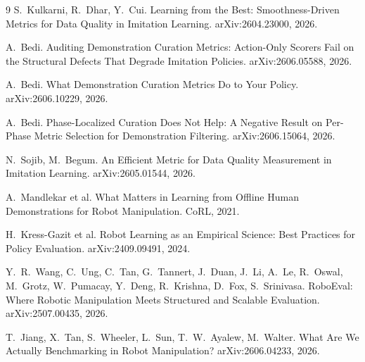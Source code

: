\documentclass[10pt]{article}
\begin{document}

\begin{thebibliography}{9}
S.~Kulkarni, R.~Dhar, Y.~Cui.
\newblock Learning from the Best: Smoothness-Driven Metrics for Data Quality
in Imitation Learning.
\newblock arXiv:2604.23000, 2026.

A.~Bedi.
\newblock Auditing Demonstration Curation Metrics: Action-Only Scorers Fail
on the Structural Defects That Degrade Imitation Policies.
\newblock arXiv:2606.05588, 2026.

A.~Bedi.
\newblock What Demonstration Curation Metrics Do to Your Policy.
\newblock arXiv:2606.10229, 2026.

A.~Bedi.
\newblock Phase-Localized Curation Does Not Help: A Negative Result on
Per-Phase Metric Selection for Demonstration Filtering.
\newblock arXiv:2606.15064, 2026.

N.~Sojib, M.~Begum.
\newblock An Efficient Metric for Data Quality Measurement in Imitation
Learning.
\newblock arXiv:2605.01544, 2026.

A.~Mandlekar et al.
\newblock What Matters in Learning from Offline Human Demonstrations for
Robot Manipulation.
\newblock CoRL, 2021.

H.~Kress-Gazit et al.
\newblock Robot Learning as an Empirical Science: Best Practices for Policy
Evaluation.
\newblock arXiv:2409.09491, 2024.

Y.~R.~Wang, C.~Ung, C.~Tan, G.~Tannert, J.~Duan, J.~Li, A.~Le, R.~Oswal,
M.~Grotz, W.~Pumacay, Y.~Deng, R.~Krishna, D.~Fox, S.~Srinivasa.
\newblock RoboEval: Where Robotic Manipulation Meets Structured and Scalable
Evaluation.
\newblock arXiv:2507.00435, 2026.

T.~Jiang, X.~Tan, S.~Wheeler, L.~Sun, T.~W.~Ayalew, M.~Walter.
\newblock What Are We Actually Benchmarking in Robot Manipulation?
\newblock arXiv:2606.04233, 2026.
\end{thebibliography}
\end{document}
